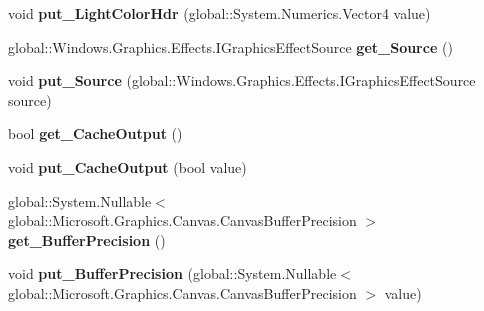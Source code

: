 \begin{DoxyCompactItemize}
void {\bfseries put\+\_\+\+Light\+Color\+Hdr} (global\+::\+System.\+Numerics.\+Vector4 value)
\item 
\mbox{\label{class_microsoft_1_1_graphics_1_1_canvas_1_1_effects_1_1_point_diffuse_effect_ad32f14685b3c97f2b3ca8c5ac7efea4a}} 
global\+::\+Windows.\+Graphics.\+Effects.\+I\+Graphics\+Effect\+Source {\bfseries get\+\_\+\+Source} ()
\item 
\mbox{\label{class_microsoft_1_1_graphics_1_1_canvas_1_1_effects_1_1_point_diffuse_effect_a4be82cb9363ab0563943cbcf22f886bc}} 
void {\bfseries put\+\_\+\+Source} (global\+::\+Windows.\+Graphics.\+Effects.\+I\+Graphics\+Effect\+Source source)
\item 
\mbox{\label{class_microsoft_1_1_graphics_1_1_canvas_1_1_effects_1_1_point_diffuse_effect_a43595c3319b479c238ad0355e73a13a5}} 
bool {\bfseries get\+\_\+\+Cache\+Output} ()
\item 
\mbox{\label{class_microsoft_1_1_graphics_1_1_canvas_1_1_effects_1_1_point_diffuse_effect_a21287c9c7b76f2a41a7bae144b521220}} 
void {\bfseries put\+\_\+\+Cache\+Output} (bool value)
\item 
\mbox{\label{class_microsoft_1_1_graphics_1_1_canvas_1_1_effects_1_1_point_diffuse_effect_a28d84ba4d9e6bc5e29a34afe5e19926d}} 
global\+::\+System.\+Nullable$<$ global\+::\+Microsoft.\+Graphics.\+Canvas.\+Canvas\+Buffer\+Precision $>$ {\bfseries get\+\_\+\+Buffer\+Precision} ()
\item 
\mbox{\label{class_microsoft_1_1_graphics_1_1_canvas_1_1_effects_1_1_point_diffuse_effect_ab65cd7f304ccd699a7869e5f58e65b1f}} 
void {\bfseries put\+\_\+\+Buffer\+Precision} (global\+::\+System.\+Nullable$<$ global\+::\+Microsoft.\+Graphics.\+Canvas.\+Canvas\+Buffer\+Precision $>$ value)
\item 
\mbox{\label{class_microsoft_1_1_graphics_1_1_canvas_1_1_effects_1_1_point_diffuse_effect_af86a39fcd805ea6d09ea049fc79d79d7}} 

\end{DoxyCompactItemize}

